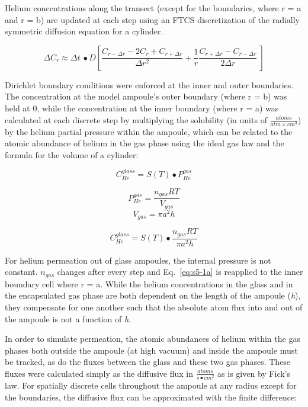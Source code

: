 Helium concentrations along the transect (except for the boundaries,
where r = a and r = b) are updated at each step using an FTCS
discretization of the radially symmetric diffusion equation for a
cylinder.

\begin{equation}
\Delta C_{r} \approx \Delta t\  \bullet D\left\lbrack \frac{C_{r - \Delta r} - 2C_{r} + C_{r + \Delta r}}{\Delta r^{2}} + \frac{1}{r}\frac{C_{r + \Delta r} - C_{r - \Delta r}}{2\Delta r}\  \right\rbrack
\label{eq:s5-0}
\end{equation}

Dirichlet boundary conditions were enforced at the inner and outer
boundaries. The concentration at the model ampoule's outer boundary
(where r = b) was held at 0, while the concentration at the inner
boundary (where r = a) was calculated at each discrete step by
multiplying the solubility (in units of
\(\frac{atoms}{atm \times cm^{3}}\)) by the helium partial pressure
within the ampoule, which can be related to the atomic abundance of helium in the gas
phase using the ideal gas law and the formula for the volume of a
cylinder:

\[C_{He}^{glass} = S(T) \bullet P_{He}^{gas}\]

\[P_{He}^{gas} = \frac{n_{gas}RT}{V_{gas}}\]
\[V_{gas} = \pi a^{2}h\]

\begin{equation}
C_{He}^{glass} = S(T) \bullet \frac{n_{gas}RT}{\pi a^{2}h}
\label{eq:s5-1a}
\end{equation}

For helium permeation out of glass ampoules, the internal pressure is not constant. \(n_{gas}\)
changes after every step and Eq.~\eqref{eq:s5-1a} is reapplied to the inner
boundary cell where r = a. While the helium concentrations in the glass
and in the encapsulated gas phase are both dependent on the length of
the ampoule (\emph{h}), they compensate for one another such that the
absolute atom flux into and out of the ampoule is not a function of
\emph{h}. 

In order to simulate permeation, the atomic abundances of helium within
the gas phases both outside the ampoule (at high vacuum) and inside the
ampoule must be tracked, as do the fluxes between the glass and these
two gas phases. These fluxes were calculated simply as the diffusive
flux in \(\frac{atoms}{s \bullet cm^{2}}\) as is given by Fick's law. 
For spatially discrete cells throughout the ampoule at any
radius except for the boundaries, the diffusive flux can be approximated
with the finite difference:


